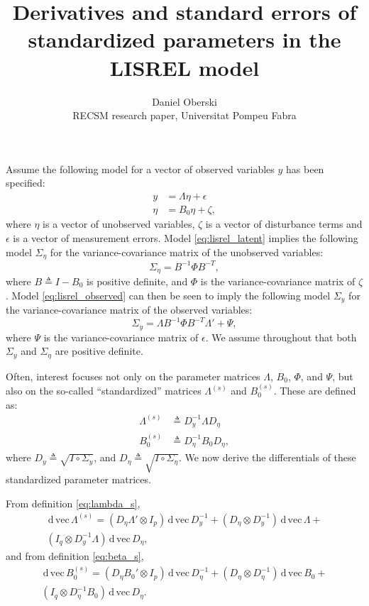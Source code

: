 \documentclass{article}
\title{Derivatives and standard errors of standardized parameters in the LISREL
model}
\author{Daniel Oberski\\RECSM research paper, Universitat Pompeu Fabra}
\newcommand{\n}{\eta}
\renewcommand{\d}{\,\mathrm{d}\,}
\newcommand{\definedas}{\triangleq}
\newcommand{\kronprod}{\otimes}
\newcommand{\hadaprod}{\circ}
\renewcommand{\vec}{\mathrm{vec}\,}
\begin{document}
\maketitle

Assume the following model for a vector of observed variables $y$ has been
specified:
\begin{align}
\label{eq:lisrel_observed}
y &= \Lambda \n + \epsilon\\
\n &= B_0 \n + \zeta,\label{eq:lisrel_latent}
\end{align}
where $\n$ is a vector of unobserved variables, $\zeta$ is a vector of
disturbance terms and $\epsilon$ is a vector of measurement errors. Model
\ref{eq:lisrel_latent} implies the following model
$\Sigma_\n$ for the variance-covariance matrix of the unobserved variables:
\begin{equation}\label{eq:sigma_n}
    \Sigma_\n = B^{-1} \Phi B^{-T},
\end{equation}
where $B \definedas I - B_0$ is positive definite, 
and $\Phi$ is the variance-covariance
matrix of $\zeta$. Model \ref{eq:lisrel_observed} can then be seen to imply the
following model $\Sigma_y$ for the variance-covariance matrix of the observed
variables:
\begin{equation}\label{eq:sigma_y}
    \Sigma_y = \Lambda B^{-1} \Phi B^{-T} \Lambda' + \Psi,
\end{equation}
where  $\Psi$ is the variance-covariance matrix of $\epsilon$. 
We assume throughout that both $\Sigma_y$ and $\Sigma_\n$ are positive
definite.

Often, interest focuses not only on the parameter matrices $\Lambda$, $B_0$, 
$\Phi$, and $\Psi$, but also on the so-called ``standardized'' matrices
$\Lambda^{(s)}$ and $B^{(s)}_0$. These are defined as:
\begin{align}\label{eq:lambda_s}
    \Lambda^{(s)} &\definedas D^{-1}_y \Lambda D_\n
    \\
    B_0^{(s)} &\definedas D^{-1}_\n B_0 D_\n,\label{eq:beta_s}
\end{align}
where $D_y \definedas \sqrt{I \hadaprod \Sigma_y}$, and 
$D_\n \definedas \sqrt{I \hadaprod \Sigma_\n}$. We now derive the differentials
of these standardized parameter matrices. 

From definition \ref{eq:lambda_s}, 
\begin{multline}\label{eq:dveclam}
\d\vec\Lambda^{(s)} = 
    (D_\n \Lambda' \kronprod I_p) \d \vec D_y^{-1} + 
    (D_\n \kronprod D_y^{-1}) \d\vec\Lambda + \\
    (I_q \kronprod D_y^{-1} \Lambda) \d\vec D_\n,
\end{multline}
and from definition \ref{eq:beta_s}, 
\begin{multline}\label{eq:dvecbeta}
\d\vec B_0^{(s)} = 
    (D_\n B_0' \kronprod I_p) \d \vec D_\n^{-1} + 
    (D_\n \kronprod D_\n^{-1}) \d\vec B_0 + \\
    (I_q \kronprod D_\n^{-1} B_0) \d\vec D_\n.
\end{multline}
\end{document}
